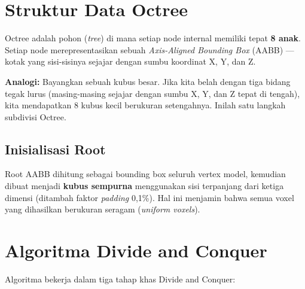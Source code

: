 \documentclass[12pt, a4paper]{report}
\begin{document}
\section{Struktur Data Octree}

Octree adalah pohon (\textit{tree}) di mana setiap node internal memiliki
tepat \textbf{8 anak}. Setiap node merepresentasikan sebuah
\textit{Axis-Aligned Bounding Box} (AABB) — kotak yang sisi-sisinya sejajar
dengan sumbu koordinat X, Y, dan Z.

\begin{infobox}
\textbf{Analogi:} Bayangkan sebuah kubus besar. Jika kita belah dengan tiga
bidang tegak lurus (masing-masing sejajar dengan sumbu X, Y, dan Z tepat di
tengah), kita mendapatkan 8 kubus kecil berukuran setengahnya. Inilah satu
langkah subdivisi Octree.
\end{infobox}

\subsection{Inisialisasi Root}

Root AABB dihitung sebagai bounding box seluruh vertex model, kemudian
dibuat menjadi \textbf{kubus sempurna} menggunakan sisi terpanjang dari
ketiga dimensi (ditambah faktor \textit{padding} 0,1\%). Hal ini menjamin
bahwa semua voxel yang dihasilkan berukuran seragam (\textit{uniform voxels}).

\section{Algoritma Divide and Conquer}

Algoritma bekerja dalam tiga tahap khas Divide and Conquer:
\end{document}
